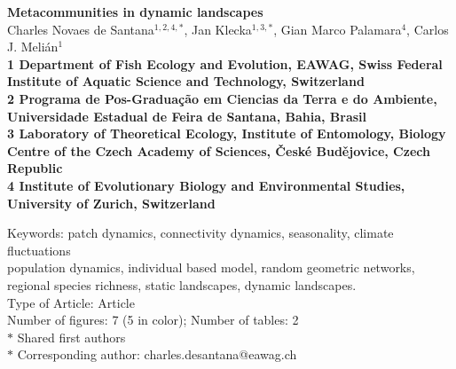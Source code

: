 \documentclass[12pt]{article}
\date{}
\begin{document}
\begin{flushleft}
{\Large
\textbf{Metacommunities in dynamic landscapes}
}
\\
\vspace{1.0cm} Charles Novaes de Santana$^{1,2,4,\ast}$, Jan
Klecka$^{1,3,\ast}$, Gian Marco Palamara$^{4}$, Carlos J. Meli\'an$^{1}$
\\
\vspace{1.0cm} \bf{1} Department of Fish Ecology and Evolution, EAWAG,
Swiss Federal Institute of Aquatic Science and Technology, Switzerland
\\
\bf{2} Programa de Pos-Graduaç\~{a}o em Ciencias da Terra e do Ambiente,
Universidade Estadual de Feira de Santana, Bahia, Brasil
\\
\bf{3} Laboratory of Theoretical Ecology, Institute of Entomology,
Biology Centre of the Czech Academy of Sciences, \v{C}esk\'{e}
Bud\v{e}jovice, Czech Republic\\
\bf{4} Institute of Evolutionary Biology and Environmental Studies, University of Zurich, Switzerland\\
  \vspace{0.5 in}
  
  Keywords: patch dynamics, connectivity dynamics, seasonality, climate fluctuations\\
  population dynamics, individual based model, random geometric networks,\\
  regional species richness, static landscapes, dynamic landscapes.\\
  Type of Article: Article\\
  Number of figures: 7 (5 in color); Number of tables: 2\\
$\ast$ Shared first authors\\
$\ast$ Corresponding author: charles.desantana@eawag.ch\\
\end{flushleft}

\newpage
\end{document}
